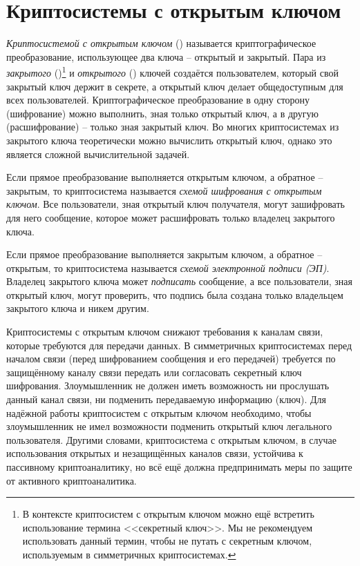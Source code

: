 \chapter{Криптосистемы с открытым ключом}\label{chapter-public-key}

\emph{Криптосистемой с открытым ключом} () называется криптографическое преобразование, использующее два ключа -- открытый и закрытый. Пара из \emph{закрытого} ()\footnote{В контексте криптосистем с открытым ключом можно ещё встретить использование термина <<секретный ключ>>. Мы не рекомендуем использовать данный термин, чтобы не путать с секретным ключом, используемым в симметричных криптосистемах.} и \emph{открытого} () ключей создаётся пользователем, который свой закрытый ключ держит в секрете, а открытый ключ делает общедоступным для всех пользователей. Криптографическое преобразование в одну сторону (шифрование) можно выполнить, зная только открытый ключ, а в другую (расшифрование) -- только зная закрытый ключ. Во многих криптосистемах из закрытого ключа теоретически можно вычислить открытый ключ, однако это является сложной вычислительной задачей.

Если прямое преобразование выполняется открытым ключом, а обратное -- закрытым, то криптосистема называется \emph{схемой шифрования с открытым ключом}. Все пользователи, зная открытый ключ получателя, могут зашифровать для него сообщение, которое может расшифровать только владелец закрытого ключа.

Если прямое преобразование выполняется закрытым ключом, а обратное -- открытым, то криптосистема называется \emph{схемой электронной подписи (ЭП)}. Владелец закрытого ключа может \emph{подписать} сообщение, а все пользователи, зная открытый ключ, могут проверить, что подпись была создана только владельцем закрытого ключа и никем другим.

Криптосистемы с открытым ключом снижают требования к каналам связи, которые требуются для передачи данных. В симметричных криптосистемах перед началом связи (перед шифрованием сообщения и его передачей) требуется по защищённому каналу связи передать или согласовать секретный ключ шифрования. Злоумышленник не должен иметь возможность ни прослушать данный канал связи, ни подменить передаваемую информацию (ключ). Для надёжной работы криптосистем с открытым ключом необходимо, чтобы злоумышленник не имел возможности подменить открытый ключ легального пользователя. Другими словами, криптосистема с открытым ключом, в случае использования открытых и незащищённых каналов связи, устойчива к пассивному криптоаналитику, но всё ещё должна предпринимать меры по защите от активного криптоаналитика.

